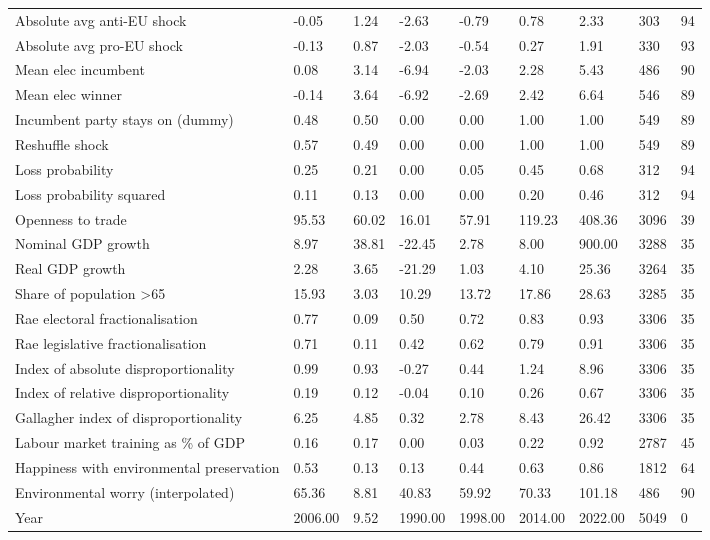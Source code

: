 \begin{longtable}{lllllllll}
Absolute avg anti-EU shock & -0.05 & 1.24 & -2.63 & -0.79 & 0.78 & 2.33 & 303 & 94\\
Absolute avg pro-EU shock & -0.13 & 0.87 & -2.03 & -0.54 & 0.27 & 1.91 & 330 & 93\\
\addlinespace
Mean elec incumbent & 0.08 & 3.14 & -6.94 & -2.03 & 2.28 & 5.43 & 486 & 90\\
Mean elec winner & -0.14 & 3.64 & -6.92 & -2.69 & 2.42 & 6.64 & 546 & 89\\
Incumbent party stays on (dummy) & 0.48 & 0.50 & 0.00 & 0.00 & 1.00 & 1.00 & 549 & 89\\
Reshuffle shock & 0.57 & 0.49 & 0.00 & 0.00 & 1.00 & 1.00 & 549 & 89\\
Loss probability & 0.25 & 0.21 & 0.00 & 0.05 & 0.45 & 0.68 & 312 & 94\\
\addlinespace
Loss probability squared & 0.11 & 0.13 & 0.00 & 0.00 & 0.20 & 0.46 & 312 & 94\\
Openness to trade & 95.53 & 60.02 & 16.01 & 57.91 & 119.23 & 408.36 & 3096 & 39\\
Nominal GDP growth & 8.97 & 38.81 & -22.45 & 2.78 & 8.00 & 900.00 & 3288 & 35\\
Real GDP growth & 2.28 & 3.65 & -21.29 & 1.03 & 4.10 & 25.36 & 3264 & 35\\
Share of population >65 & 15.93 & 3.03 & 10.29 & 13.72 & 17.86 & 28.63 & 3285 & 35\\
\addlinespace
Rae electoral fractionalisation & 0.77 & 0.09 & 0.50 & 0.72 & 0.83 & 0.93 & 3306 & 35\\
Rae legislative fractionalisation & 0.71 & 0.11 & 0.42 & 0.62 & 0.79 & 0.91 & 3306 & 35\\
Index of absolute disproportionality & 0.99 & 0.93 & -0.27 & 0.44 & 1.24 & 8.96 & 3306 & 35\\
Index of relative disproportionality & 0.19 & 0.12 & -0.04 & 0.10 & 0.26 & 0.67 & 3306 & 35\\
Gallagher index of disproportionality & 6.25 & 4.85 & 0.32 & 2.78 & 8.43 & 26.42 & 3306 & 35\\
\addlinespace
Labour market training as \% of GDP & 0.16 & 0.17 & 0.00 & 0.03 & 0.22 & 0.92 & 2787 & 45\\
Happiness with environmental preservation & 0.53 & 0.13 & 0.13 & 0.44 & 0.63 & 0.86 & 1812 & 64\\
Environmental worry (interpolated) & 65.36 & 8.81 & 40.83 & 59.92 & 70.33 & 101.18 & 486 & 90\\
Year & 2006.00 & 9.52 & 1990.00 & 1998.00 & 2014.00 & 2022.00 & 5049 & 0\\
\bottomrule
\end{longtable}
